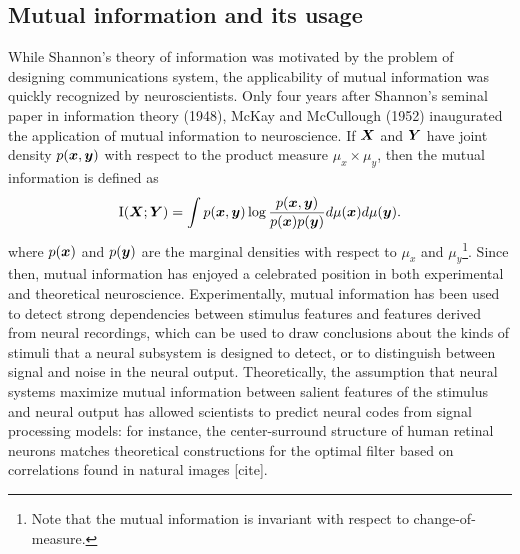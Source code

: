 \documentclass[12pt]{article}
\begin{document}
\subsection{Mutual information and its usage}\label{sec:background_mi}
While Shannon's theory of information was motivated by the problem of
designing communications system, the applicability of mutual
information was quickly recognized by neuroscientists.  Only four
years after Shannon's seminal paper in information theory (1948),
McKay and McCullough (1952) inaugurated the application of mutual
information to neuroscience.  If $\boldsymbol{X}$ and $\boldsymbol{Y}$ have joint density
$p(\boldsymbol{x}, \boldsymbol{y})$ with respect to the product measure $\mu_x \times \mu_y$, then the mutual information is defined as
\[
\text{I}(\boldsymbol{X};\boldsymbol{Y}) = \int p(\boldsymbol{x}, \boldsymbol{y}) \log \frac{p(\boldsymbol{x}, \boldsymbol{y})}{p(\boldsymbol{x})p(\boldsymbol{y})}d\mu(\boldsymbol{x}) d\mu(\boldsymbol{y}).
\]
where $p(\boldsymbol{x})$ and $p(\boldsymbol{y})$ are the marginal densities with respect to
$\mu_x$ and $\mu_y$\footnote{Note that the mutual information is invariant with respect to change-of-measure.}.  Since then, mutual information has enjoyed a
celebrated position in both experimental and theoretical neuroscience.
Experimentally, mutual information has been used to detect strong
dependencies between stimulus features and features derived from
neural recordings, which can be used to draw conclusions about the
kinds of stimuli that a neural subsystem is designed to detect, or to
distinguish between signal and noise in the neural output.
Theoretically, the assumption that neural systems maximize mutual
information between salient features of the stimulus and neural output
has allowed scientists to predict neural codes from signal processing
models: for instance, the center-surround structure of human retinal
neurons matches theoretical constructions for the optimal filter based
on correlations found in natural images [cite].
\end{document}
